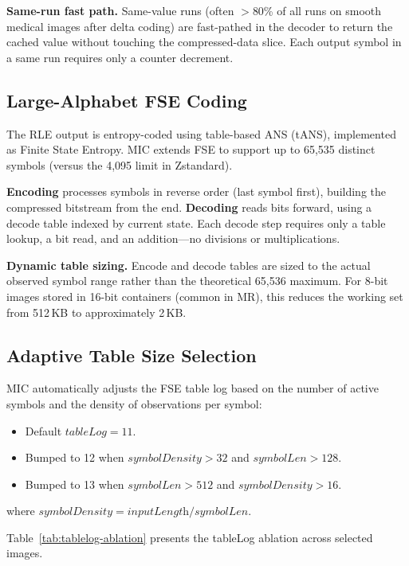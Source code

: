 \documentclass[journal]{IEEEtran}
\begin{document}
\textbf{Same-run fast path.} Same-value runs (often $>$80\% of all runs on
smooth medical images after delta coding) are fast-pathed in the decoder to
return the cached value without touching the compressed-data slice. Each output
symbol in a same run requires only a counter decrement.

\subsection{Large-Alphabet FSE Coding}

The RLE output is entropy-coded using table-based ANS (tANS), implemented as
Finite State Entropy. MIC extends FSE to support up to 65,535 distinct symbols
(versus the 4,095 limit in Zstandard).

\textbf{Encoding} processes symbols in reverse order (last symbol first),
building the compressed bitstream from the end. \textbf{Decoding} reads bits
forward, using a decode table indexed by current state. Each decode step
requires only a table lookup, a bit read, and an addition---no divisions or
multiplications.

\textbf{Dynamic table sizing.} Encode and decode tables are sized to the actual
observed symbol range rather than the theoretical 65,536 maximum. For 8-bit
images stored in 16-bit containers (common in MR), this reduces the working set
from 512\,KB to approximately 2\,KB.

\subsection{Adaptive Table Size Selection}

MIC automatically adjusts the FSE table log based on the number of active
symbols and the density of observations per symbol:
\begin{itemize}
  \item Default $\textit{tableLog} = 11$.
  \item Bumped to 12 when $\textit{symbolDensity} > 32$ and
  $\textit{symbolLen} > 128$.
  \item Bumped to 13 when $\textit{symbolLen} > 512$ and
  $\textit{symbolDensity} > 16$.
\end{itemize}
where $\textit{symbolDensity} = \textit{inputLength} / \textit{symbolLen}$.

Table~\ref{tab:tablelog-ablation} presents the tableLog ablation across
selected images.
\end{document}

